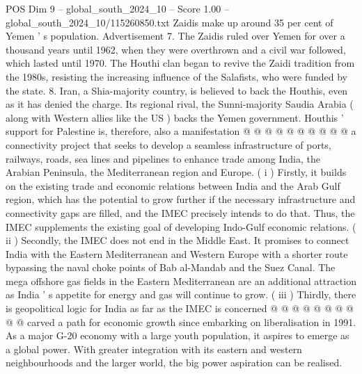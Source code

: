 \begin{textsample}{POS Dim 9 – global\_south\_2024\_10 – Score 1.00 – global\_south\_2024\_10/115260850.txt}
Zaidis make up around 35 per cent of Yemen ' s population.
Advertisement 7.
The Zaidis ruled over Yemen for over a thousand years until 1962, when they were overthrown and a civil war followed, which lasted until 1970.
The Houthi clan began to revive the Zaidi tradition from the 1980s, resisting the increasing influence of the Salafists, who were funded by the state. 8.
Iran, a Shia-majority country, is believed to back the Houthis, even as it has denied the charge.
Its regional rival, the Sunni-majority Saudia Arabia ( along with Western allies like the US ) backs the Yemen government.
Houthis ' support for Palestine is, therefore, also a manifestation @ @ @ @ @ @ @ @ @ @ a connectivity project that seeks to develop a seamless infrastructure of ports, railways, roads, sea lines and pipelines to enhance trade among India, the Arabian Peninsula, the Mediterranean region and Europe. ( i ) Firstly, it builds on the existing trade and economic relations between India and the Arab Gulf region, which has the potential to grow further if the necessary infrastructure and connectivity gaps are filled, and the IMEC precisely intends to do that.
Thus, the IMEC supplements the existing goal of developing Indo-Gulf economic relations. ( ii ) Secondly, the IMEC does not end in the Middle East.
It promises to connect India with the Eastern Mediterranean and Western Europe with a shorter route bypassing the naval choke points of Bab al-Mandab and the Suez Canal.
The mega offshore gas fields in the Eastern Mediterranean are an additional attraction as India ' s appetite for energy and gas will continue to grow. ( iii ) Thirdly, there is geopolitical logic for India as far as the IMEC is concerned @ @ @ @ @ @ @ @ @ @ carved a path for economic growth since embarking on liberalisation in 1991.
As a major G-20 economy with a large youth population, it aspires to emerge as a global power.
With greater integration with its eastern and western neighbourhoods and the larger world, the big power aspiration can be realised.

\end{textsample}
